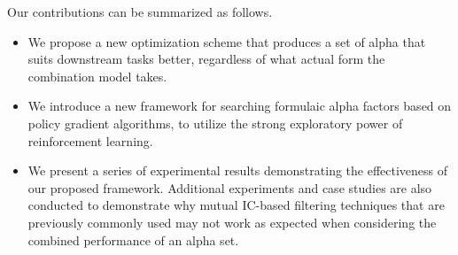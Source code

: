 Our contributions can be summarized as follows.
\begin{itemize}
    \item We propose a new optimization scheme that produces a set of alpha that suits downstream tasks better, regardless of what actual form the combination model takes.
    \item We introduce a new framework for searching formulaic alpha factors based on policy gradient algorithms, to utilize the strong exploratory power of reinforcement learning.
    \item We present a series of experimental results demonstrating the effectiveness of our proposed framework. Additional experiments and case studies are also conducted to demonstrate why mutual IC-based filtering techniques that are previously commonly used may not work as expected when considering the combined performance of an alpha set.
\end{itemize}
